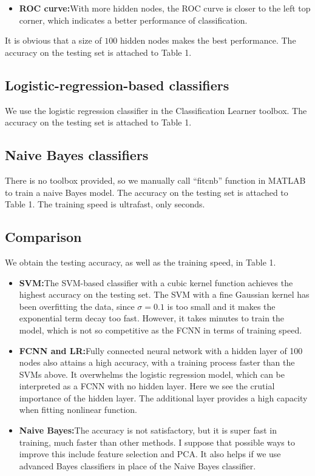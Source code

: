 \documentclass{article}
\begin{document}
{{\begin{itemize}
            \item \textbf{ROC curve:}\quad With more hidden nodes, the ROC curve is closer to the left top corner, which indicates a better performance of classification. 
        \end{itemize}

        It is obvious that a size of $100$ hidden nodes makes the best performance. The accuracy on the testing set is attached to Table 1.
    }

    \subsection*{Logistic-regression-based classifiers}
    {
        We use the logistic regression classifier in the Classification Learner toolbox. The accuracy on the testing set is attached to Table 1.
    }

    \subsection*{Naive Bayes classifiers}
    {
        There is no toolbox provided, so we manually call ``fitcnb'' function in MATLAB to train a naive Bayes model. The accuracy on the testing set is attached to Table 1. The training speed is ultrafast, only seconds.
    }

    \subsection*{Comparison}
    {
        We obtain the testing accuracy, as well as the training speed, in Table 1. 
        
        \begin{itemize}
            \item \textbf{SVM:}\quad The SVM-based classifier with a cubic kernel function achieves the highest accuracy on the testing set. The SVM with a fine Gaussian kernel has been overfitting the data, since $\sigma=0.1$ is too small and it makes the exponential term decay too fast. However, it takes minutes to train the model, which is not so competitive as the FCNN in terms of training speed.

            \item \textbf{FCNN and LR:}\quad Fully connected neural network with a hidden layer of 100 nodes also attains a high accuracy, with a training process faster than the SVMs above. It overwhelms the logistic regression model, which can be interpreted as a FCNN with no hidden layer. Here we see the crutial importance of the hidden layer. The additional layer provides a high capacity when fitting nonlinear function. 
        
            \item \textbf{Naive Bayes:}\quad The accuracy is not satisfactory, but it is super fast in training, much faster than other methods. I suppose that possible ways to improve this include feature selection and PCA. It also helps if we use advanced Bayes classifiers in place of the Naive Bayes classifier. 
        \end{itemize}

    }
}
\end{document}
